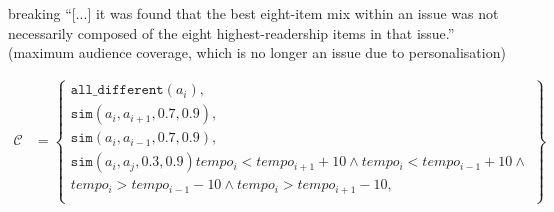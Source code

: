 breaking
``[...] it was found that the best eight-item  mix within an issue was not necessarily composed of the eight highest-readership items in that issue.'' \cite{EditorsDilemma} (maximum audience coverage, which is no longer an issue due to personalisation)

\begin{align*}
\mathcal{C} &=	\begin{Bmatrix}
					\texttt{all\_different}(a_i),\\
					\texttt{sim}(a_i, a_{i+1}, 0.7, 0.9), \\
					\texttt{sim}(a_i, a_{i-1}, 0.7, 0.9), \\
					\texttt{sim}(a_i, a_j, 0.3, 0.9)
					tempo_i < tempo_{i+1} + 10 \wedge tempo_i < tempo_{i-1} + 10 \wedge\\
					tempo_i > tempo_{i-1} - 10 \wedge tempo_i > tempo_{i+1} - 10,\\
				\end{Bmatrix}
\end{align*}




